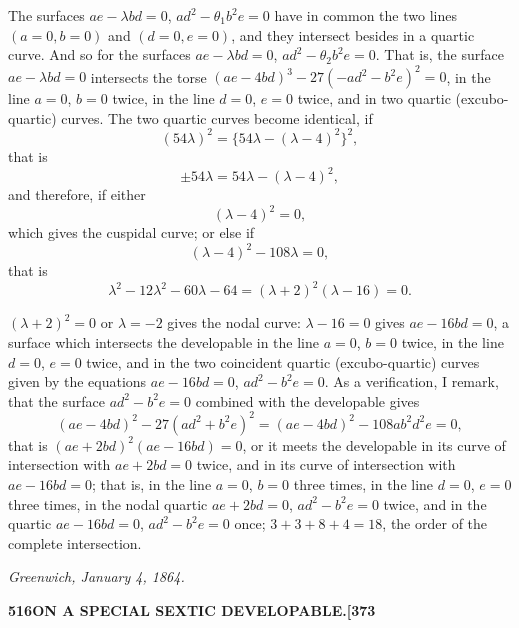 \documentclass[11pt,a4paper]{article}
\begin{document}
The surfaces $ae - \lambda bd = 0$, $ad^{2} - \theta_{1}b^{2}e = 0$ have in common the two lines $(a = 0, b = 0)$ and $(d = 0, e = 0)$, and they intersect besides in a quartic curve. And so for the surfaces $ae - \lambda bd = 0$, $ad^{2} - \theta_{2}b^{2}e = 0$. That is, the surface $ae - \lambda bd = 0$ intersects the torse $(ae - 4bd)^{3} - 27(-ad^{2} - b^{2}e)^{2} = 0$, in the line $a = 0$, $b = 0$ twice, in the line $d = 0$, $e = 0$ twice, and in two quartic (excubo-quartic) curves. The two quartic curves become identical, if
\[
(54\lambda)^{2} = \{54\lambda - (\lambda - 4)^{2}\}^{2},
\]
that is
\[
\pm 54\lambda = 54\lambda - (\lambda - 4)^{2},
\]
and therefore, if either
\[
(\lambda - 4)^{2} = 0,
\]
which gives the cuspidal curve; or else if
\[
(\lambda - 4)^{2} - 108\lambda = 0,
\]
that is
\[
\lambda^{2} - 12\lambda^{2} - 60\lambda - 64 = (\lambda + 2)^{2}(\lambda - 16) = 0.
\]

$(\lambda + 2)^{2} = 0$ or $\lambda = -2$ gives the nodal curve: $\lambda - 16 = 0$ gives $ae - 16bd = 0$, a surface which intersects the developable in the line $a = 0$, $b = 0$ twice, in the line $d = 0$, $e = 0$ twice, and in the two coincident quartic (excubo-quartic) curves given by the equations $ae - 16bd = 0$, $ad^{2} - b^{2}e = 0$. As a verification, I remark, that the surface $ad^{2} - b^{2}e = 0$ combined with the developable gives
\[
(ae - 4bd)^{2} - 27(ad^{2} + b^{2}e)^{2} = (ae - 4bd)^{2} - 108ab^{2}d^{2}e = 0,
\]
that is $(ae + 2bd)^{2}(ae - 16bd) = 0$, or it meets the developable in its curve of intersection with $ae + 2bd = 0$ twice, and in its curve of intersection with $ae - 16bd = 0$; that is, in the line $a = 0$, $b = 0$ three times, in the line $d = 0$, $e = 0$ three times, in the nodal quartic $ae + 2bd = 0$, $ad^{2} - b^{2}e = 0$ twice, and in the quartic $ae - 16bd = 0$, $ad^{2} - b^{2}e = 0$ once; $3 + 3 + 8 + 4 = 18$, the order of the complete intersection.

\begin{flushright}
\textit{Greenwich, January 4, 1864.}
\end{flushright}

\newpage
\noindent\textbf{516\hspace{1em}ON A SPECIAL SEXTIC DEVELOPABLE.\hfill[373}

\vspace{12pt}
\end{document}
